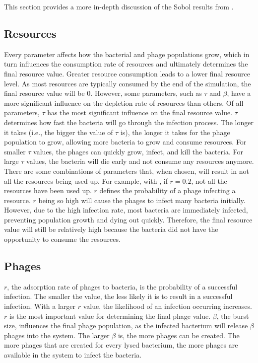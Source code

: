 This section provides a more in-depth discussion of the Sobol results from . 

\subsection{Resources}
Every parameter affects how the bacterial and phage populations grow, which in turn influences the consumption rate of resources and ultimately determines the final resource value. 
Greater resource consumption leads to a lower final resource level.
As most resources are typically consumed by the end of the simulation, the final resource value will be 0. 
However, some parameters, such as $\tau$ and $\beta$, have a more significant influence on the depletion rate of resources than others. 
Of all parameters, $\tau$ has the most significant influence on the final resource value. 
$\tau$ determines how fast the bacteria will go through the infection process. 
The longer it takes (i.e., the bigger the value of $\tau$ is), the longer it takes for the phage population to grow, allowing more bacteria to grow and consume resources. 
For smaller $\tau$ values, the phages can quickly grow, infect, and kill the bacteria. 
For large $\tau$ values, the bacteria will die early and not consume any resources anymore. 
There are some combinations of parameters that, when chosen, will result in not all the resources being used up. 
For example, with , if $r = 0.2$, not all the resources have been used up. 
$r$ defines the probability of a phage infecting a resource. 
$r$ being so high will cause the phages to infect many bacteria initially. 
However, due to the high infection rate, most bacteria are immediately infected, preventing population growth and dying out quickly. 
Therefore, the final resource value will still be relatively high because the bacteria did not have the opportunity to consume the resources. 

\subsection{Phages}
$r$, the adsorption rate of phages to bacteria, is the probability of a successful infection. 
The smaller the value, the less likely it is to result in a successful infection. 
With a larger $r$ value, the likelihood of an infection occurring increases. 
$r$ is the most important value for determining the final phage value. 
$\beta$, the burst size, influences the final phage population, as the infected bacterium will release $\beta$ phages into the system. 
The larger $\beta$ is, the more phages can be created. 
The more phages that are created for every lysed bacterium, the more phages are available in the system to infect the bacteria. 

